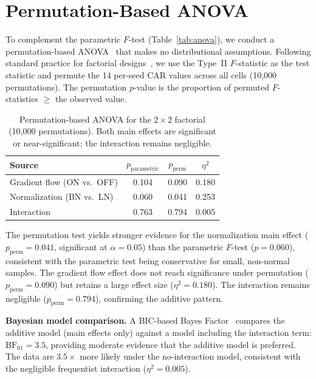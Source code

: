 \section{Permutation-Based ANOVA}
\label{app:permutation}

To complement the parametric $F$-test (Table~\ref{tab:anova}), we conduct a permutation-based ANOVA~\cite{anderson2001permanova} that makes no distributional assumptions. Following standard practice for factorial designs~\cite{montgomery2017doe}, we use the Type~II $F$-statistic as the test statistic and permute the 14 per-seed CAR values across all cells (10{,}000 permutations). The permutation $p$-value is the proportion of permuted $F$-statistics $\geq$ the observed value.

\begin{table}[h]
\centering
\caption{Permutation-based ANOVA for the $2{\times}2$ factorial (10{,}000 permutations). Both main effects are significant or near-significant; the interaction remains negligible.}
\label{tab:permanova}
\begin{tabular}{lccc}
\toprule
Source & $p_\text{parametric}$ & $p_\text{perm}$ & $\eta^2$ \\
\midrule
Gradient flow (ON vs.\ OFF) & 0.104 & 0.090 & 0.180 \\
Normalization (BN vs.\ LN) & 0.060 & 0.041 & 0.253 \\
Interaction & 0.763 & 0.794 & 0.005 \\
\bottomrule
\end{tabular}
\end{table}

The permutation test yields stronger evidence for the normalization main effect ($p_\text{perm}{=}0.041$, significant at $\alpha{=}0.05$) than the parametric $F$-test ($p{=}0.060$), consistent with the parametric test being conservative for small, non-normal samples. The gradient flow effect does not reach significance under permutation ($p_\text{perm}{=}0.090$) but retains a large effect size ($\eta^2{=}0.180$). The interaction remains negligible ($p_\text{perm}{=}0.794$), confirming the additive pattern.

\textbf{Bayesian model comparison.} A BIC-based Bayes Factor~\cite{wagenmakers2007practical} compares the additive model (main effects only) against a model including the interaction term: $\text{BF}_{01}{=}3.5$, providing moderate evidence that the additive model is preferred. The data are $3.5{\times}$ more likely under the no-interaction model, consistent with the negligible frequentist interaction ($\eta^2{=}0.005$).

